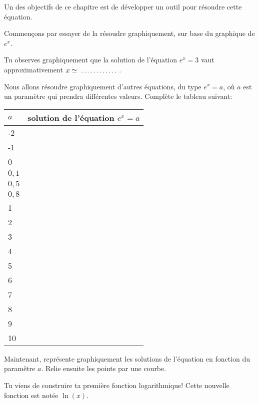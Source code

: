 \documentclass[a4paper,12pt,singlepage]{report}
\newcommand{\jdot}[1]{ \makebox[#1]{\dotfill}}
\begin{document}
Un des objectifs de ce chapitre est de développer un outil pour résoudre cette
équation.

Commençons par essayer de la résoudre graphiquement, sur base du graphique de
\(e^x\).


\begin{center}

\end{center}

Tu observes graphiquement que la solution de l'équation \(e^x=3\) vaut
approximativement \(x\simeq\jdot{2cm}\).

Nous allons résoudre graphiquement d'autres équations, du type \(e^x=a\), où \(a\)
est un paramètre qui prendra différentes valeurs. Complète le tableau suivant:


\begin{center}
\begin{tabular}{|p{3cm}|p{5cm}|}
\hline
\(a\) & solution de l'équation \(e^x=a\)\\[0pt]
\hline
-2 & \\[0pt]
\hline
-1 & \\[0pt]
\hline
0 & \\[0pt]
\hline
\(0,1\) & \\[0pt]
\hline
\(0,5\) & \\[0pt]
\hline
\(0,8\) & \\[0pt]
\hline
1 & \\[0pt]
\hline
2 & \\[0pt]
\hline
3 & \\[0pt]
\hline
4 & \\[0pt]
\hline
5 & \\[0pt]
\hline
6 & \\[0pt]
\hline
7 & \\[0pt]
\hline
8 & \\[0pt]
\hline
9 & \\[0pt]
\hline
10 & \\[0pt]
\hline
\end{tabular}
\end{center}

Maintenant, représente graphiquement les solutions de l'équation en fonction du
paramêtre \(a\). Relie ensuite les points par une courbe.

\begin{center}

\end{center}

Tu viens de construire ta première fonction logarithmique! Cette nouvelle
fonction est notée \(\ln(x)\).
\end{document}
